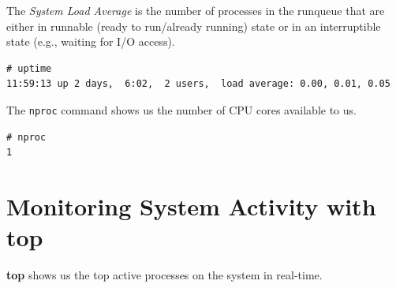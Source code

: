 The \textit{System Load Average} is the number of processes in the runqueue that are either in runnable (ready to run/already running) state or in an interruptible state (e.g., waiting for I/O access). 

\vspace{-15pt}
\begin{verbatim}
# uptime
11:59:13 up 2 days,  6:02,  2 users,  load average: 0.00, 0.01, 0.05
\end{verbatim}
\vspace{-10pt}

\noindent
The \verb|nproc| command shows us the number of CPU cores available to us. 

\vspace{-15pt}
\begin{verbatim}
# nproc
1
\end{verbatim}
\vspace{-10pt}

	\section{Monitoring System Activity with top}
\textbf{top} shows us the top active processes on the system in real-time. 

